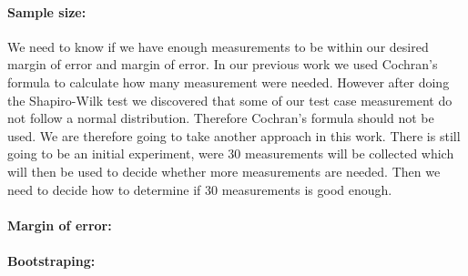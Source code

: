\paragraph{Sample size:}
We need to know if we have enough measurements to be within our desired margin of error and margin of error. In our previous work we used Cochran's formula to calculate how many measurement were needed. However after doing the Shapiro-Wilk test we discovered that some of our test case measurement do not follow a normal distribution. Therefore Cochran's formula should not be used. We are therefore going to take another approach in this work. There is still going to be an initial experiment, were 30 measurements will be collected which will then be used to decide whether more measurements are needed. Then we need to decide how to determine if 30 measurements is good enough.

\paragraph{Margin of error:} 

\paragraph{Bootstraping:}



